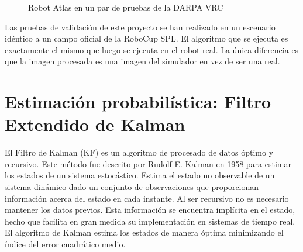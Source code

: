 \begin{figure}[h]
  \centering
  \caption{Robot Atlas en un par de pruebas de la DARPA VRC}
  \label{fig:darpavrc}
\end{figure}

Las pruebas de validación de este proyecto se han realizado en un escenario idéntico a un campo oficial de la RoboCup SPL. El algoritmo que se ejecuta es exactamente el mismo que luego se ejecuta en el robot real. La única diferencia es que la imagen procesada es una imagen del simulador en vez de ser una real. \\

\section{Estimación probabilística: Filtro Extendido de Kalman}
\label{sec:filtroextendidodekalman}

El Filtro de Kalman (KF) es un algoritmo de procesado de datos óptimo y recursivo. Este método fue descrito por Rudolf E. Kalman en 1958 para estimar los estados de un sistema estocástico. Estima el estado no observable de un sistema dinámico dado un conjunto de observaciones que proporcionan información acerca del estado en cada instante. Al ser recursivo no es necesario mantener los datos previos. Esta información se encuentra implícita en el estado, hecho que facilita en gran medida su implementación en sistemas de tiempo real. El algoritmo de Kalman estima los estados de manera óptima minimizando el índice del error cuadrático medio.\\

